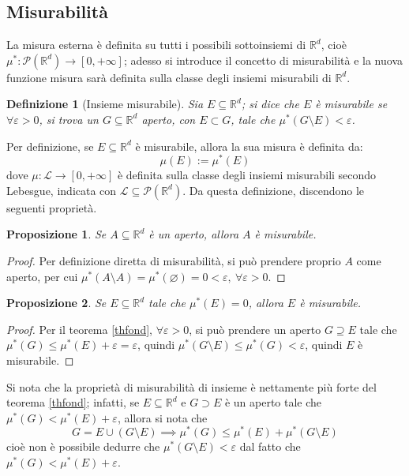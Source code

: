 \documentclass[11pt]{article}
\theoremstyle{style}
\newtheorem{definizione}{Definizione}[section]
\newtheorem{prop}{Proposizione}[section]
\numberwithin{equation}{subsection}
\begin{document}
\subsection{Misurabilit\`a}
La misura esterna \`e definita su tutti i possibili sottoinsiemi di $\mathbb{R}^d$, cio\`e $\mu ^* : \mathcal{P} (\mathbb{R}^d) \to [0,+\infty]$; adesso si introduce il concetto di misurabilit\`a e la nuova funzione misura sar\`a definita sulla classe degli insiemi misurabili di $\mathbb{R}^d$.
\begin{definizione}
	[Insieme misurabile]
	Sia $E \subseteq \mathbb{R}^d$; si dice che $E$ \`e \textit{misurabile} se $\forall \varepsilon >0$, si trova un $G \subseteq \mathbb{R}^d$ aperto, con $E \subset G$, tale che $\mu ^*(G \setminus E) < \varepsilon $.
\end{definizione}
Per definizione, se $E \subseteq \mathbb{R}^d$ \`e misurabile, allora la sua misura \`e definita da:
\[
\mu (E) := \mu ^*(E)
\] 
dove $\mu:\mathscr{L} \to [0,+\infty] $ \`e definita sulla classe degli insiemi misurabili secondo Lebesgue, indicata con $\mathscr{L} \subseteq \mathcal{P} (\mathbb{R}^d)$.
Da questa definizione, discendono le seguenti propriet\`a.
\begin{prop}\label{apmis}
	Se $A \subseteq \mathbb{R}^d$ \`e un aperto, allora $A$ \`e misurabile.
\end{prop}
	\begin{proof}
		Per definizione diretta di misurabilit\`a, si pu\`o prendere proprio $A$ come aperto, per cui $\mu ^*(A \setminus A) = \mu ^* (\varnothing)=0 < \varepsilon , \ \forall \varepsilon >0$.
	\end{proof}
\begin{prop}
	Se $E \subseteq \mathbb{R}^d$ tale che $\mu ^*(E) = 0$, allora $E$ \`e misurabile.
\end{prop}
	\begin{proof}
		Per il teorema \ref{thfond}, $\forall \varepsilon >0$, si pu\`o prendere un aperto $G \supseteq E$ tale che $\mu ^*(G) \le \mu ^*(E) + \varepsilon = \varepsilon $, quindi $\mu ^*(G\setminus E) \le \mu ^*(G) < \varepsilon $, quindi $E$ \`e misurabile.
	\end{proof}
Si nota che la propriet\`a di misurabilit\`a di insieme \`e nettamente pi\`u forte del teorema \ref{thfond}; infatti, se $E \subseteq \mathbb{R}^d$ e $G \supset E$ \`e un aperto tale che $\mu ^*(G) < \mu ^*(E) + \varepsilon $, allora si nota che 
\[
G = E \cup (G\setminus E) \implies \mu ^*(G) \le \mu ^*(E) + \mu ^*(G\setminus E)
\] 
cio\`e non \`e possibile dedurre che $\mu ^*(G\setminus E) < \varepsilon $ dal fatto che $\mu ^*(G) <\mu ^*(E) + \varepsilon $.
\end{document}
